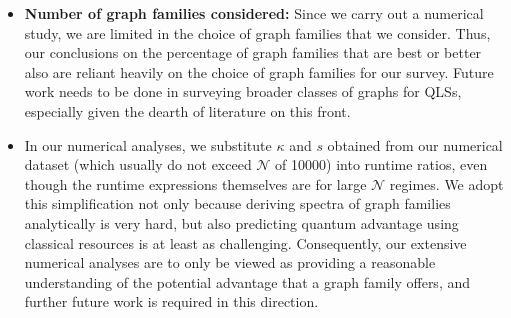 \documentclass[%
 reprint,
 superscriptaddress,
 amsmath,amssymb,
 aps,
 pra,
floatfix,
nofootinbib,
]{revtex4-2}
\theoremstyle{definition}
\theoremstyle{remark}
\begin{document}
\begin{appendix}
\begin{itemize}
\item \textbf{Number of graph families considered: }Since we carry out a numerical study, we are limited in the choice of graph families that we consider. Thus, our conclusions on the percentage of graph families that are best or better also are reliant heavily on the choice of graph families for our survey. Future work needs to be done in surveying broader classes of graphs for QLSs, especially given the dearth of literature on this front. 

\item In our numerical analyses, we substitute $\kappa$ and $s$ obtained from our numerical dataset (which usually do not exceed $\mathcal{N}$ of 10000) into runtime ratios, even though the runtime expressions themselves are for large $\mathcal{N}$ regimes. We adopt this simplification not only because deriving spectra of graph families analytically is very hard, but also predicting quantum advantage using classical resources is at least as challenging. Consequently, our extensive numerical analyses are to only be viewed as providing a reasonable understanding of the potential advantage that a graph family offers, and further future work is required in this direction. 


\end{itemize}
\end{appendix}
\end{document}

